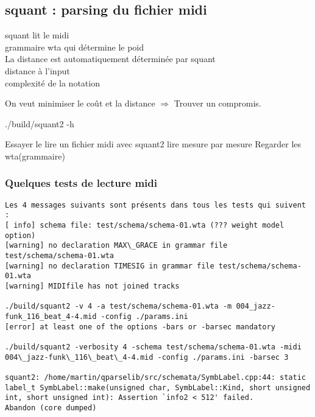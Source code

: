 \subsection{squant : parsing du fichier midi}
squant lit le midi\\
grammaire wta qui détermine le poid\\
La distance est automatiquement déterminée par squant\\
distance à l’input\\
complexité de la notation

On veut minimiser le coût et la distance $\Rightarrow$ Trouver un compromis.

./build/squant2 -h

Essayer le lire un fichier midi avec squant2
lire mesure par mesure
Regarder les wta(grammaire)

\subsubsection{Quelques tests de lecture midi}
\begin{verbatim}
Les 4 messages suivants sont présents dans tous les tests qui suivent :
[ info] schema file: test/schema/schema-01.wta (??? weight model option)
[warning] no declaration MAX\_GRACE in grammar file test/schema/schema-01.wta
[warning] no declaration TIMESIG in grammar file test/schema/schema-01.wta
[warning] MIDIfile has not joined tracks

./build/squant2 -v 4 -a test/schema/schema-01.wta -m 004_jazz-funk_116_beat_4-4.mid -config ./params.ini
[error] at least one of the options -bars or -barsec mandatory

./build/squant2 -verbosity 4 -schema test/schema/schema-01.wta -midi 004\_jazz-funk\_116\_beat\_4-4.mid -config ./params.ini -barsec 3

squant2: /home/martin/qparselib/src/schemata/SymbLabel.cpp:44: static label_t SymbLabel::make(unsigned char, SymbLabel::Kind, short unsigned int, short unsigned int): Assertion `info2 < 512' failed.
Abandon (core dumped)
\end{verbatim}
\newpage